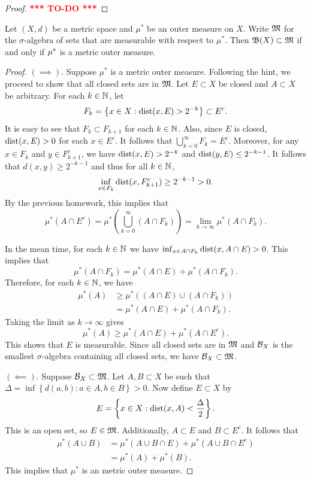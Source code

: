 \documentclass[a4paper]{article}
\newcommand{\TODO}{\textcolor{red}{\textbf{*** TO-DO ***}}}
\renewcommand{\cupinfk}{\bigcup_{k=0}^\infty}
\begin{document}
\begin{proof}
  \TODO
\end{proof}

\begin{thm}
  Let $(X,d)$ be a metric space and $\mu^*$ be an outer measure on $X$.
  Write $\mathfrak{M}$ for the $\sigma$-algebra of sets that are measurable with
  respect to $\mu^*$. Then $\mathfrak{B}(X) \subset \mathfrak{M}$ if and only if $\mu^*$ is a
  metric outer measure.
\end{thm}

\begin{proof}
  $(\implies)$. Suppose $\mu^*$ is a metric outer measure.
  Following the hint, we proceed to show that all closed
  sets are in $\mathfrak{M}$. Let $E \subset X$ be closed and
  $A \subset X$ be arbitrary. For each $k \in \mathbb{N}$, let
  \[
    F_k = \left\{ x \in X : \operatorname{dist}(x, E) > 2^{-k} \right\}
    \subset E^c.
  \]
  It is easy to see that $F_k \subset F_{k+1}$ for each $k \in \mathbb{N}$. Also,
  since $E$ is closed, $\operatorname{dist}(x, E) > 0$ for each $x \in E^c$. It follows
  that $\cupinfk F_k = E^c$. Moreover, for any $x \in F_k$ and $y \in
  F_{k+1}^c$, we have $\operatorname{dist}(x, E) > 2^{-k}$ and $\operatorname{dist}(y, E) \leq
  2^{-k-1}$. It follows that $d(x, y) \geq 2^{-k-1}$ and thus for all $k
  \in \mathbb{N}$,
  \[
    \inf_{x \in F_k} \operatorname{dist}(x, F_{k+1}^c) \geq 2^{-k-1} > 0.
  \]
  By the previous homework, this implies that
  \[
    \mu^* (A \cap E^c)
    = \mu^* \left( \cupinfk (A \cap F_k) \right)
    = \lim_{k \to \infty} \mu^* (A \cap F_k).
  \]

  In the mean time, for each $k \in \mathbb{N}$ we have $\inf_{x \in A \cap F_k}
  \operatorname{dist}(x, A \cap E) > 0$. This implies that
  \[
    \mu^*(A \cap F_k) = \mu^*(A \cap E) + \mu^* (A \cap F_k).
  \]
  Therefore, for each $k \in \mathbb{N}$, we have
  \[
    \begin{aligned}
      \mu^*(A)
       & \geq \mu^*((A \cap E) \cup (A \cap F_k)) \\
       & = \mu^* (A \cap E) + \mu^*(A \cap F_k).
    \end{aligned}
  \]
  Taking the limit as $k \to \infty$ gives
  \[
    \mu^*(A) \geq \mu^*(A \cap E) + \mu^*(A \cap E^c).
  \]
  This shows that $E$ is measurable. Since all closed sets are in $\mathfrak{M}$
  and $\mathcal{B}_X$ is the smallest $\sigma$-algebra containing all closed sets,
  we have $\mathcal{B}_X \subset \mathfrak{M}$.

  $(\impliedby)$.
  Suppose $\mathcal{B}_X \subset \mathfrak{M}$. Let $A, B \subset X$ be
  such that $\Delta =
    \inf \left\{ d(a, b) : a \in A, b \in B \right\} > 0$.
  Now define $E \subset X$ by
  \[
    E = \left\{ x \in X: \operatorname{dist}(x, A) < \frac{\Delta}{2} \right\}.
  \]
  This is an open set, so $E \in \mathfrak{M}$. Additionally, $A \subset E$ and $B
  \subset E^c$. It follows that
  \[
    \begin{aligned}
      \mu^*(A \cup B)
       & = \mu^*(A \cup B \cap E) + \mu^* (A \cup B \cap E^c) \\
       & = \mu^*(A) + \mu^*(B).
    \end{aligned}
  \]
  This implies that $\mu^*$ is an metric outer measure.
\end{proof}
\end{document}

